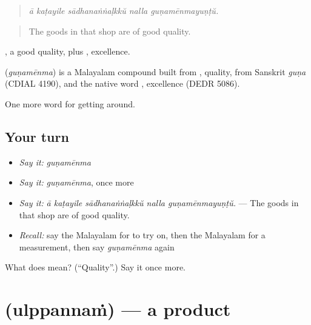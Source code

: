 \begin{quote}
\emph{ā kaṭayile sādhanaṅṅaḷkkŭ nalla guṇamēnmayuṇṭŭ.}
\end{quote}

\begin{quote}
The goods in that shop are of good quality.
\end{quote}

, a good quality, plus , excellence.

\begin{cousinweb}
\textbf{} (\emph{guṇamēnma}) is a Malayalam compound built from , quality, from Sanskrit \emph{guṇa} (CDIAL 4190), and the native word , excellence (DEDR 5086).
\end{cousinweb}

\begin{grammarlens}[title={What you've built}]
One more word for getting around.
\end{grammarlens}

\subsection*{Your turn}
\begin{itemize}
\raggedright
  \item \emph{Say it:} \emph{guṇamēnma}
  \item \emph{Say it:} \emph{guṇamēnma}, once more
  \item \emph{Say it:} \emph{ā kaṭayile sādhanaṅṅaḷkkŭ nalla guṇamēnmayuṇṭŭ.} — The goods in that shop are of good quality.
  \item \emph{Recall:} say the Malayalam for to try on, then the Malayalam for a measurement, then say \emph{guṇamēnma} again
\end{itemize}

\begin{tcolorbox}[breakable,colback=teal!4,colframe=teal!35!black,title={Before you move on}]
What does  mean? (\textquotedblleft{}Quality\textquotedblright{}.) Say it once more.
\end{tcolorbox}
\section[\texorpdfstring{\ml{ഉൽപ്പന്നം} (ulppannaṁ)}{ഉൽപ്പന്നം (ulppannaṁ)}]{ (ulppannaṁ) — a product}

\label{lesson:ML-C492-ulppannam}



